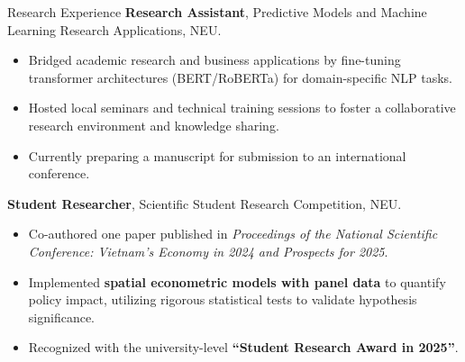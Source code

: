\begin{rubric}{Research Experience}
    \textbf{Research Assistant}, Predictive Models and Machine Learning Research Applications, NEU.
    \begin{itemize}
        \item Bridged academic research and business applications by fine-tuning transformer architectures (BERT/RoBERTa) for domain-specific NLP tasks.
        \item Hosted local seminars and technical training sessions to foster a collaborative research environment and knowledge sharing.
        \item Currently preparing a manuscript for submission to an international conference.
    \end{itemize}
%
%
    \textbf{Student Researcher}, Scientific Student Research Competition, NEU.
    \begin{itemize}
        \item Co-authored one paper published in \textit{Proceedings of the National Scientific Conference: Vietnam's Economy in 2024 and Prospects for 2025}.
        \item Implemented \textbf{spatial econometric models with panel data} to quantify policy impact, utilizing rigorous statistical tests to validate hypothesis significance.
        \item Recognized with the university-level \textbf{``Student Research Award in 2025''}.
    \end{itemize}
\end{rubric}

